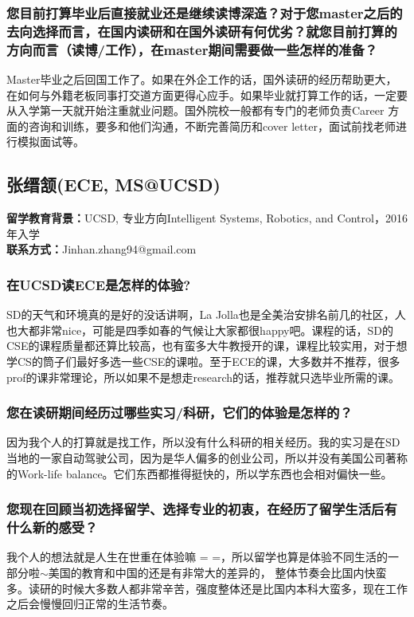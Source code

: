 \documentclass[a4paper,UTF8]{book}
\begin{document}
    \subsubsection*{您目前打算毕业后直接就业还是继续读博深造？对于您master之后的去向选择而言，在国内读研和在国外读研有何优劣？就您目前打算的方向而言（读博/工作），在master期间需要做一些怎样的准备？}
    Master毕业之后回国工作了。如果在外企工作的话，国外读研的经历帮助更大，在如何与外籍老板同事打交道方面更得心应手。如果毕业就打算工作的话，一定要从入学第一天就开始注重就业问题。国外院校一般都有专门的老师负责Career 方面的咨询和训练，要多和他们沟通，不断完善简历和cover letter，面试前找老师进行模拟面试等。


\clearpage
\subsection{张缙颔(ECE, MS@UCSD)}
    \textbf{留学教育背景：}UCSD, 专业方向Intelligent Systems, Robotics, and Control，2016年入学\\
    \textbf{联系方式：}Jinhan.zhang94@gmail.com

    \subsubsection*{在UCSD读ECE是怎样的体验?}
    SD的天气和环境真的是好的没话讲啊，La Jolla也是全美治安排名前几的社区，人也大都非常nice，可能是四季如春的气候让大家都很happy吧。课程的话，SD的CSE的课程质量都还算比较高，也有蛮多大牛教授开的课，课程比较实用，对于想学CS的筒子们最好多选一些CSE的课啦。至于ECE的课，大多数并不推荐，很多prof的课非常理论，所以如果不是想走research的话，推荐就只选毕业所需的课。
    
    \subsubsection*{您在读研期间经历过哪些实习/科研，它们的体验是怎样的？}
    因为我个人的打算就是找工作，所以没有什么科研的相关经历。我的实习是在SD当地的一家自动驾驶公司，因为是华人偏多的创业公司，所以并没有美国公司著称的Work-life balance。它们东西都推得挺快的，所以学东西也会相对偏快一些。
    
    \subsubsection*{您现在回顾当初选择留学、选择专业的初衷，在经历了留学生活后有什么新的感受？}
    我个人的想法就是人生在世重在体验嘛 = =，所以留学也算是体验不同生活的一部分啦$\sim$美国的教育和中国的还是有非常大的差异的， 整体节奏会比国内快蛮多。读研的时候大多数人都非常辛苦，强度整体还是比国内本科大蛮多，现在工作之后会慢慢回归正常的生活节奏。
\end{document}
